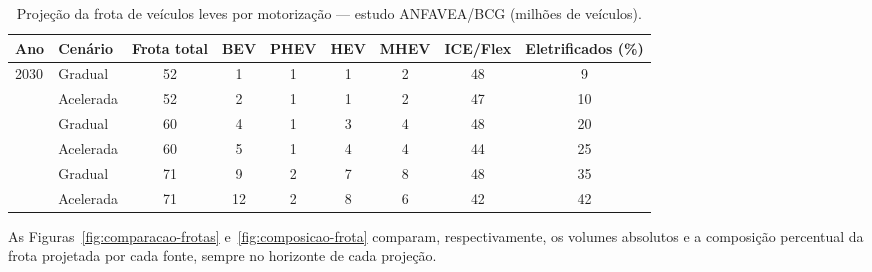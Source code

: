 \begin{table}[H]
\centering
\caption{Projeção da frota de veículos leves por motorização — estudo
         ANFAVEA/BCG (milhões de veículos).}
\label{tab:bcg}
\small
\setlength{\tabcolsep}{4.5pt}
\begin{tabular}{llccccccc}
\toprule
\textbf{Ano} & \textbf{Cenário} & \textbf{Frota total} & \textbf{BEV} &
\textbf{PHEV} & \textbf{HEV} & \textbf{MHEV} & \textbf{ICE/Flex} &
\textbf{Eletrificados (\%)} \\
\midrule
\multirow{2}{*}{2030} & Gradual   & 52 & 1  & 1 & 1 & 2 & 48 & 9  \\
                      & Acelerada & 52 & 2  & 1 & 1 & 2 & 47 & 10 \\
\addlinespace
\multirow{2}{*}{2035} & Gradual   & 60 & 4  & 1 & 3 & 4 & 48 & 20 \\
                      & Acelerada & 60 & 5  & 1 & 4 & 4 & 44 & 25 \\
\addlinespace
\multirow{2}{*}{2040} & Gradual   & 71 & 9  & 2 & 7 & 8 & 48 & 35 \\
                      & Acelerada & 71 & 12 & 2 & 8 & 6 & 42 & 42 \\
\bottomrule
\end{tabular}
\end{table}

As Figuras~\ref{fig:comparacao-frotas} e~\ref{fig:composicao-frota} comparam,
respectivamente, os volumes absolutos e a composição percentual da frota projetada
por cada fonte, sempre no horizonte de cada projeção.

